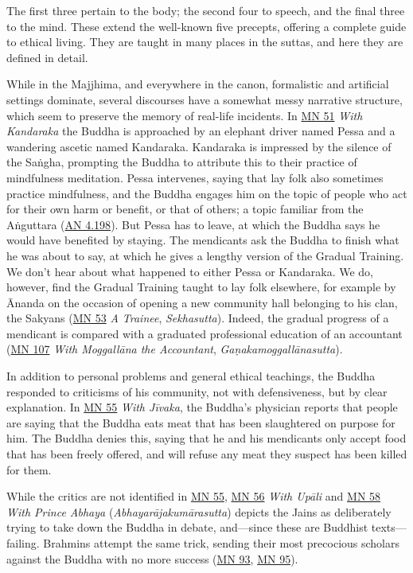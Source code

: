 \documentclass[12pt,openany]{book}%
\begin{document}
The first three pertain to the body; the second four to speech, and the final three to the mind. These extend the well-known five precepts, offering a complete guide to ethical living. They are taught in many places in the suttas, and here they are defined in detail.

While in the Majjhima, and everywhere in the canon, formalistic and artificial settings dominate, several discourses have a somewhat messy narrative structure, which seem to preserve the memory of real-life incidents. In \href{https://suttacentral.net/mn51}{MN 51} \textit{With Kandaraka} the Buddha is approached by an elephant driver named Pessa and a wandering ascetic named Kandaraka. Kandaraka is impressed by the silence of the \textsanskrit{Saṅgha}, prompting the Buddha to attribute this to their practice of mindfulness meditation. Pessa intervenes, saying that lay folk also sometimes practice mindfulness, and the Buddha engages him on the topic of people who act for their own harm or benefit, or that of others; a topic familiar from the \textsanskrit{Aṅguttara} (\href{https://suttacentral.net/an4.198}{AN 4.198}). But Pessa has to leave, at which the Buddha says he would have benefited by staying. The mendicants ask the Buddha to finish what he was about to say, at which he gives a lengthy version of the Gradual Training. We don’t hear about what happened to either Pessa or Kandaraka. We do, however, find the Gradual Training taught to lay folk elsewhere, for example by Ānanda on the occasion of opening a new community hall belonging to his clan, the Sakyans (\href{https://suttacentral.net/mn53}{MN 53} \textit{A Trainee}, \textit{Sekhasutta}). Indeed, the gradual progress of a mendicant is compared with a graduated professional education of an accountant (\href{https://suttacentral.net/mn107}{MN 107} \textit{With \textsanskrit{Moggallāna} the Accountant}, \textit{\textsanskrit{Gaṇakamoggallānasutta}}).

In addition to personal problems and general ethical teachings, the Buddha responded to criticisms of his community, not with defensiveness, but by clear explanation. In \href{https://suttacentral.net/mn55}{MN 55} \textit{With \textsanskrit{Jīvaka}}, the Buddha’s physician reports that people are saying that the Buddha eats meat that has been slaughtered on purpose for him. The Buddha denies this, saying that he and his mendicants only accept food that has been freely offered, and will refuse any meat they suspect has been killed for them.

While the critics are not identified in \href{https://suttacentral.net/mn55}{MN 55}, \href{https://suttacentral.net/mn56}{MN 56} \textit{With \textsanskrit{Upāli}} and \href{https://suttacentral.net/mn58}{MN 58} \textit{With Prince Abhaya} (\textit{\textsanskrit{Abhayarājakumārasutta}}) depicts the Jains as deliberately trying to take down the Buddha in debate, and—since these are Buddhist texts—failing. Brahmins attempt the same trick, sending their most precocious scholars against the Buddha with no more success (\href{https://suttacentral.net/mn93}{MN 93}, \href{https://suttacentral.net/mn95}{MN 95}).
\end{document}
